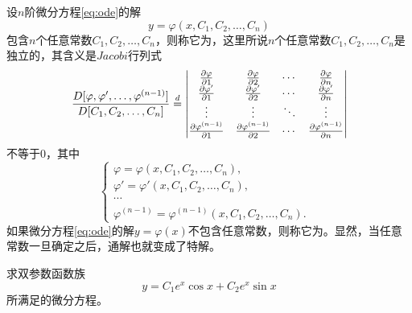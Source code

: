 \begin{defn}[常微分方程的通解与特解]\label{def:odesol:genspec}
    设$n$阶微分方程\eqref{eq:ode}的解
    \begin{equation}\label{eq:odesol:genspec}
        y=\varphi(x,C_1,C_2,\ldots,C_n)
    \end{equation}
    包含$n$个任意常数$C_1,C_2,\ldots,C_n$，则称它为，这里所说$n$个任意常数$C_1,C_2,\ldots,C_n$是独立的，其含义是$Jacobi$行列式
    \[
        \frac{D[\varphi,\varphi',\ldots,\varphi^{(n-1)}]}{D[C_1,C_2,\ldots,C_n]}
        \overset{d}{=}
        \begin{vmatrix}
        \frac{\partial{}\varphi}{\partial{}1} & \frac{\partial{}\varphi}{\partial{}2} & \cdots & \frac{\partial{}\varphi}{\partial{}n} \\
        \frac{\partial{}\varphi'}{\partial{}1} & \frac{\partial{}\varphi'}{\partial{}2} & \cdots & \frac{\partial{}\varphi'}{\partial{}n} \\
        \vdots & \vdots & \ddots & \vdots \\
        \frac{\partial{}\varphi^{(n-1)}}{\partial{}1} & \frac{\partial{}\varphi^{(n-1)}}{\partial{}2} & \cdots & \frac{\partial{}\varphi^{(n-1)}}{\partial{}n} \\
        \end{vmatrix}
    \]
    不等于0，其中
    \[
        \begin{cases}
        \varphi =\varphi(x,C_1,C_2,\ldots,C_n), & \\
        \varphi' =\varphi'(x,C_1,C_2,\ldots,C_n), & \\
        \cdots & \\
        \varphi^{(n-1)}=\varphi^{(n-1)}(x,C_1,C_2,\ldots,C_n). &
        \end{cases}
    \]
    如果微分方程\eqref{eq:ode}的解$y=\varphi(x)$不包含任意常数，则称它为。显然，当任意常数一旦确定之后，通解也就变成了特解。
\end{defn}

\begin{example}
    求双参数函数族
    \begin{equation}\label{eq:exa:doublepara}
        y=C_1e^x\cos x+C_2e^x\sin x
    \end{equation}
    所满足的微分方程。
\end{example}

